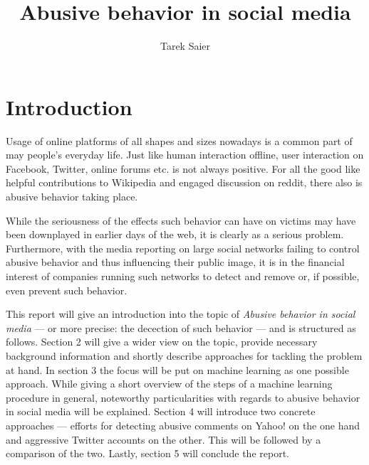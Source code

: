 \documentclass{proseminar}
\begin{document}

\title{Abusive behavior in social media}

\author{
Tarek Saier\\
}

\maketitle

\section{Introduction}
Usage of online platforms of all shapes and sizes nowadays is a common part of may people's everyday life. Just like human interaction offline, user interaction on Facebook, Twitter, online forums etc. is not always positive. For all the good like helpful contributions to Wikipedia and engaged discussion on reddit, there also is abusive behavior taking place.

While the seriousness of the effects such behavior can have on victims may have been downplayed in earlier days of the web, it is clearly as a serious problem. Furthermore, with the media reporting on large social networks failing to control abusive behavior and thus influencing their public image, it is in the financial interest of companies running such networks to detect and remove or, if possible, even prevent such behavior.

This report will give an introduction into the topic of \emph{Abusive behavior in social media} --- or more precise: the decection of such behavior --- and is structured as follows. Section 2 will give a wider view on the topic, provide necessary background information and shortly describe approaches for tackling the problem at hand. In section 3 the focus will be put on machine learning as one possible approach. While giving a short overview of the steps of a machine learning procedure in general, noteworthy particularities with regards to abusive behavior in social media will be explained. Section 4 will introduce two concrete approaches --- efforts for detecting abusive comments on Yahoo! on the one hand and aggressive Twitter accounts on the other. This will be followed by a comparison of the two. Lastly, section 5 will conclude the report.
\end{document}
